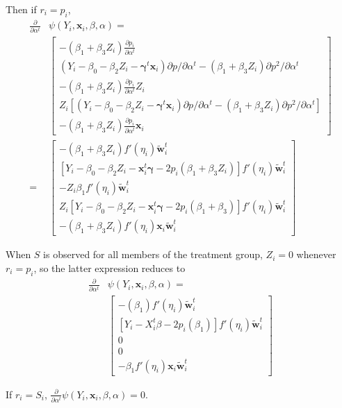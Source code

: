 \documentclass[11pt]{article} %
\begin{document}
Then if $r_i=p_i$,
\begin{align*}
  \frac{\partial}{\partial \alpha^t}&\psi(Y_i,\bm{x}_i,\beta,\alpha)=\\
  &\left[\begin{array}{c}
          -(\beta_1+\beta_3Z_i)\frac{\partial p_i}{\partial \alpha^t}\\
          (Y_i-\beta_0-\beta_2Z_i-\bm{\gamma}^t\bm{x}_{i})\partial p/\partial\alpha^t-(\beta_1+\beta_3Z_i)\partial p^2/\partial \alpha^t\\
          -(\beta_1+\beta_3Z_i)\frac{\partial p_i}{\partial \alpha^t}Z_i\\
          Z_i\left[(Y_i-\beta_0-\beta_2Z_i-\bm{\gamma}^t\bm{x}_{i})\partial p/\partial\alpha^t-(\beta_1+\beta_3Z_i)\partial p^2/\partial \alpha^t\right]\\
          -(\beta_1+\beta_3Z_i)\frac{\partial p_i}{\partial \alpha^t}\bm{x}_i
        \end{array}\right]\\
  =& \left[\begin{array}{c}
          -(\beta_1+\beta_3Z_i)f'(\eta_i)\bm{\tilde{w}}_i^t\\
          \left[Y_i-\beta_0-\beta_2Z_i-\bm{x}_i^t\bm{\gamma}-2p_i(\beta_1+\beta_3Z_i)\right]f'(\eta_i)\bm{\tilde{w}}_i^t\\
          -Z_i\beta_1f'(\eta_i)\bm{\tilde{w}}_i^t\\
          Z_i\left[Y_i-\beta_0-\beta_2Z_i-\bm{x}_i^t\bm{\gamma}-2p_i(\beta_1+\beta_3)\right]f'(\eta_i)\bm{\tilde{w}}_i^t\\
          -(\beta_1+\beta_3Z_i)f'(\eta_i)\bm{x}_i\bm{\tilde{w}}_i^t
    \end{array}\right]
\end{align*}

When $S$ is observed for all members of the treatment group, $Z_i=0$ whenever $r_i=p_i$, so the latter expression reduces to
\begin{align*}
  \frac{\partial}{\partial \alpha^t}&\psi(Y_i,\bm{x}_i,\beta,\alpha)=\\
  & \left[\begin{array}{c}
          -(\beta_1)f'(\eta_i)\bm{\tilde{w}}_i^t\\
          \left[Y_i-X_i^t\beta-2p_i(\beta_1)\right]f'(\eta_i)\bm{\tilde{w}}_i^t\\
          0\\
          0\\
          -\beta_1f'(\eta_i)\bm{x}_i\bm{\tilde{w}}_i^t
    \end{array}\right]
\end{align*}

If $r_i=S_i$, $\frac{\partial}{\partial \alpha^t}\psi(Y_i,\bm{x}_i,\beta,\alpha)=0$.
\end{document}
